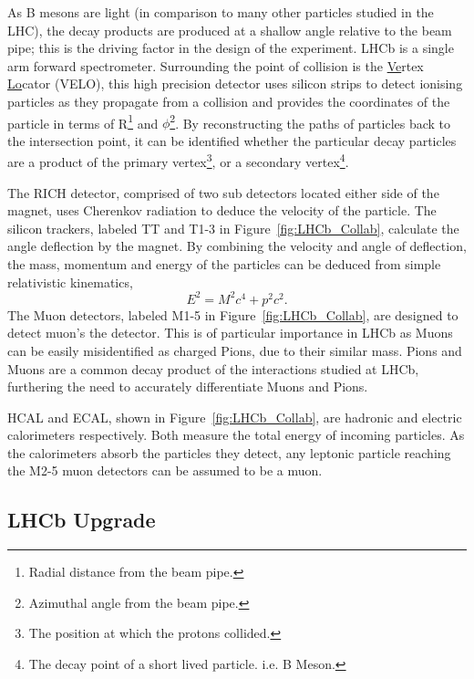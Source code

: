     As B mesons are light (in comparison to many other particles studied in the LHC), the decay products are produced at a shallow angle relative to the beam pipe;
    this is the driving factor in the design of the experiment. 
    LHCb is a single arm forward spectrometer.
    Surrounding the point of collision is the \underline{Ve}rtex \underline{Lo}cator (VELO), this high precision detector uses silicon strips to detect ionising particles as they propagate from a collision and provides the coordinates of the particle in terms of R\footnote{Radial distance from the beam pipe.} and $\phi$\footnote{Azimuthal angle from the beam pipe.}.
    By reconstructing the paths of particles back to the intersection point, it can be identified whether the particular decay particles are a product of the primary vertex\footnote{The position at which the protons collided.}, or a secondary vertex\footnote{The decay point of a short lived particle. i.e. B Meson.}.
    \par
    The RICH detector, comprised of two sub detectors located either side of the magnet, uses Cherenkov radiation to deduce the velocity of the particle. The silicon trackers, labeled TT and T1-3 in Figure~\ref{fig:LHCb_Collab}, calculate the angle deflection by the magnet. 
    By combining the velocity and angle of deflection, the mass, momentum and energy of the particles can be deduced from simple relativistic kinematics,
    \begin{equation}
      E^2 = M^2c^4 + p^2c^2.
    \end{equation}
    The Muon detectors, labeled M1-5 in Figure~\ref{fig:LHCb_Collab}, are designed to detect muon's the detector. 
    This is of particular importance in LHCb as Muons can be easily misidentified as charged Pions, due to their similar mass.
    Pions and Muons are a common decay product of the interactions studied at LHCb, furthering the need to accurately differentiate Muons and Pions.
    \par
    HCAL and ECAL, shown in Figure~\ref{fig:LHCb_Collab}, are hadronic and electric calorimeters respectively. 
    Both measure the total energy of incoming particles.
    As the calorimeters absorb the particles they detect, any leptonic particle reaching the M2-5 muon detectors can be assumed to be a muon.

  \subsection{LHCb Upgrade} %
  \label{sub:lhcb_upgrade}

